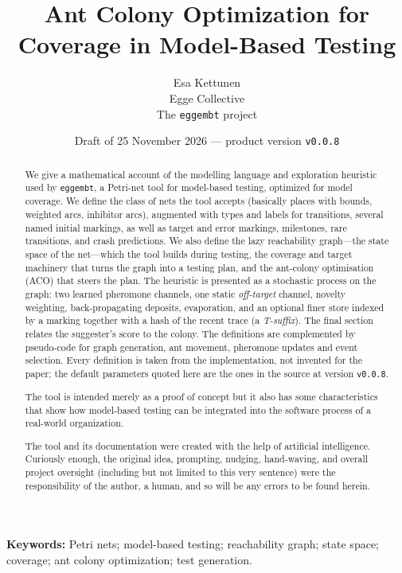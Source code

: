\documentclass[11pt,a4paper]{article}
\title{\textbf{Ant Colony Optimization for Coverage in Model-Based Testing}}
\author{Esa Kettunen \\
  Egge Collective \\
  The \texttt{eggembt} project}
\date{Draft of 25 November 2026 --- product version \texttt{v0.0.8}}
\begin{document}
\maketitle

\begin{abstract}

We give a mathematical account of the modelling language and
exploration heuristic used by \texttt{eggembt}, a Petri-net tool for
model-based testing, optimized for model coverage.  We define the
class of nets the tool accepts (basically places with bounds, weighted
arcs, inhibitor arcs), augmented with types and labels for transitions,
several named initial markings, as well as target and error markings,
milestones, rare transitions, and crash predictions. We also define
the lazy reachability graph---the state space of the net---which the
tool builds during testing, the coverage and target machinery that
turns the graph into a testing plan, and the ant-colony optimisation
(ACO) that steers the plan.  The heuristic is presented as a
stochastic process on the graph: two learned pheromone channels, one
static \emph{off-target} channel, novelty weighting, back-propagating
deposits, evaporation, and an optional finer store indexed by a
marking together with a hash of the recent trace (a \emph{T-suffix}).
The final section relates the suggester's score to the colony.  The
definitions are complemented by pseudo-code for graph generation, ant
movement, pheromone updates and event selection.  Every definition is
taken from the implementation, not invented for the paper; the default
parameters quoted here are the ones in the source at version
\texttt{v0.0.8}.

The tool is intended merely as a proof of concept but it also has some
characteristics that show how model-based testing can be integrated into
the software process of a real-world organization.

The tool and its documentation were created with the help of
artificial intelligence. Curiously enough, the original idea,
prompting, nudging, hand-waving, and overall project oversight
(including but not limited to this very sentence) were the
responsibility of the author, a human, and so will be any errors to be
found herein.

\end{abstract}

\medskip
\noindent\textbf{Keywords:} Petri nets; model-based testing; reachability
graph; state space; coverage; ant colony optimization; test generation.
\end{document}

